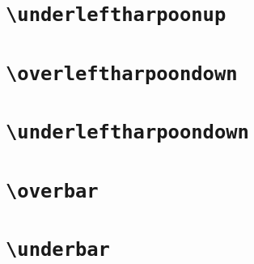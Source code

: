 \documentclass[12pt]{article}
\begin{document}
\begin{dispExample}
  \TestOverArrow{\overleftharpoonup}
\end{dispExample}

\section{\texttt{\textbackslash underleftharpoonup}}

\begin{dispExample}
  \TestOverArrow{\underleftharpoonup}
\end{dispExample}

\section{\texttt{\textbackslash overleftharpoondown}}

\begin{dispExample}
  \TestOverArrow{\overleftharpoondown}
\end{dispExample}

\section{\texttt{\textbackslash underleftharpoondown}}

\begin{dispExample}
  \TestOverArrow{\underleftharpoondown}
\end{dispExample}

\section{\texttt{\textbackslash overbar}}

\begin{dispExample}
  \TestOverArrow*{\overbar}
\end{dispExample}

\section{\texttt{\textbackslash underbar}}

\begin{dispExample}
  \TestOverArrow*{\underbar}
\end{dispExample}
\end{document}
